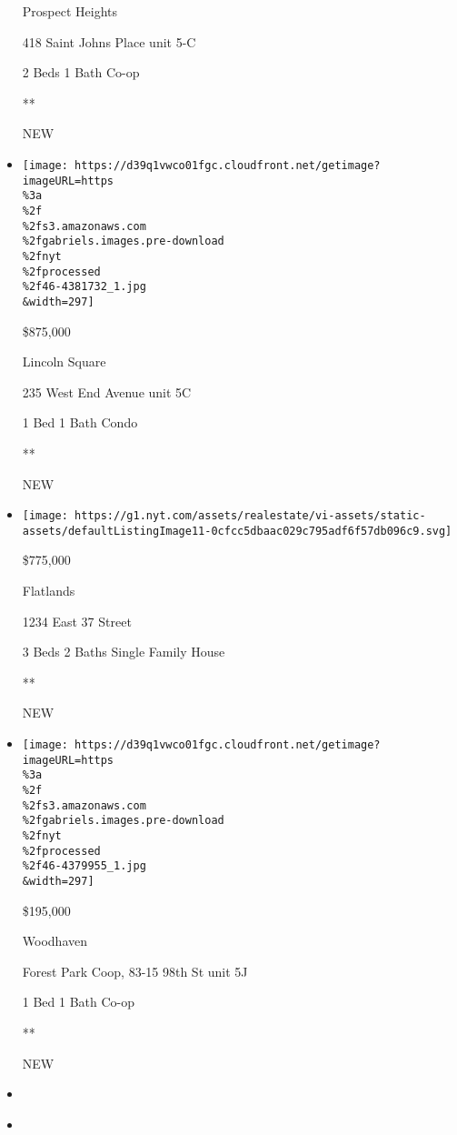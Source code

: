 \begin{itemize}
  Prospect Heights

  418 Saint Johns Place unit 5-C

  2 Beds \textbar{} 1 Bath \textbar{} Co-op

  **

  NEW
\item
  \href{/real-estate/usa/ny/new-york/lincoln-square/homes-for-sale/235-west-end-avenue/46-4381732?}{}

  \texttt{[image: https://d39q1vwco01fgc.cloudfront.net/getimage?imageURL=https\\\%3a\\\%2f\\\%2fs3.amazonaws.com\\\%2fgabriels.images.pre-download\\\%2fnyt\\\%2fprocessed\\\%2f46-4381732\_1.jpg\\\&width=297]}

  \$875,000

  Lincoln Square

  235 West End Avenue unit 5C

  1 Bed \textbar{} 1 Bath \textbar{} Condo

  **

  NEW
\item
  \href{/real-estate/usa/ny/brooklyn/flatlands/homes-for-sale/1234-east-37-street/15055-5535909?}{}

  \texttt{[image: https://g1.nyt.com/assets/realestate/vi-assets/static-assets/defaultListingImage11-0cfcc5dbaac029c795adf6f57db096c9.svg]}

  \$775,000

  Flatlands

  1234 East 37 Street

  3 Beds \textbar{} 2 Baths \textbar{} Single Family House

  **

  NEW
\item
  \href{/real-estate/usa/ny/queens/woodhaven/homes-for-sale/forest-park-coop-83-15-98th-st/46-4379955?}{}

  \texttt{[image: https://d39q1vwco01fgc.cloudfront.net/getimage?imageURL=https\\\%3a\\\%2f\\\%2fs3.amazonaws.com\\\%2fgabriels.images.pre-download\\\%2fnyt\\\%2fprocessed\\\%2f46-4379955\_1.jpg\\\&width=297]}

  \$195,000

  Woodhaven

  Forest Park Coop, 83-15 98th St unit 5J

  1 Bed \textbar{} 1 Bath \textbar{} Co-op

  **

  NEW
\item
\item
  \href{/real-estate/usa/ny/new-york/harlem/homes-for-sale/102-west-123rd-street/12436-OLRS-0048859?}{}


\end{itemize}
